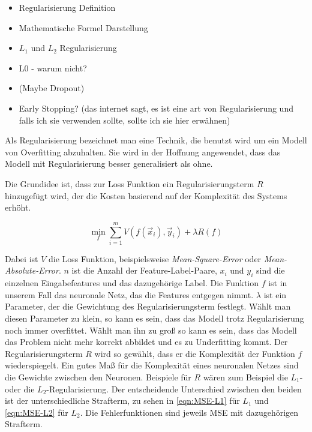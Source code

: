 \begin{itemize}
	\item Regularisierung Definition
	\item Mathematische Formel Darstellung
	\item \(L_1\) und \(L_2\) Regularisierung
	\item L0 - warum nicht?
	\item (Maybe Dropout)
	\item Early Stopping? (das internet sagt, es ist eine art von Regularisierung und falls ich sie verwenden sollte, sollte ich sie hier erwähnen)
\end{itemize}

\color{blue}
Als Regularisierung bezeichnet man eine Technik, die benutzt wird um ein Modell von Overfitting abzuhalten.
Sie wird in der Hoffnung angewendet, dass das Modell mit Regularisierung besser generalisiert als ohne.

Die Grundidee ist, dass zur Loss Funktion ein Regularisierungsterm \(R\) hinzugefügt wird, 
der die Kosten basierend auf der Komplexität des Systems erhöht.

\begin{equation}
	\min_f \sum\limits_{i=1}^{m} V(f(\vec{x}_i), \vec{y}_i) + \lambda R(f)
\end{equation} 

Dabei ist \(V\) die Loss Funktion, beispielsweise \textit{Mean-Square-Error} oder \textit{Mean-Absolute-Error}.
\(n\) ist die Anzahl der Feature-Label-Paare,
\(x_i\) und \(y_i\) sind die einzelnen Eingabefeatures und das dazugehörige Label.
Die Funktion \(f\) ist in unserem Fall das neuronale Netz, das die Features entgegen nimmt.
\(\lambda\) ist ein Parameter, der die Gewichtung des Regularisierungsterm festlegt.
Wählt man diesen Parameter zu klein, so kann es sein, dass das Modell trotz Regularisierung noch immer overfittet.
Wählt man ihn zu groß so kann es sein, dass das Modell das Problem nicht mehr korrekt abbildet und es zu Underfitting kommt.
Der Regularisierungsterm \(R\) wird so gewählt, dass er die Komplexität der Funktion \(f\) wiederspiegelt.
Ein gutes Maß für die Komplexität eines neuronalen Netzes sind die Gewichte zwischen den Neuronen.
Beispiele für \(R\) wären zum Beispiel die \(L_1\)- oder die \(L_2\)-Regularisierung. %
Der entscheidende Unterschied zwischen den beiden ist der unterschiedliche Strafterm, zu sehen in \ref{eqn:MSE-L1} für \(L_1\) und \ref{eqn:MSE-L2} für \(L_2\). 
Die Fehlerfunktionen sind jeweils MSE mit dazugehörigen Strafterm.

